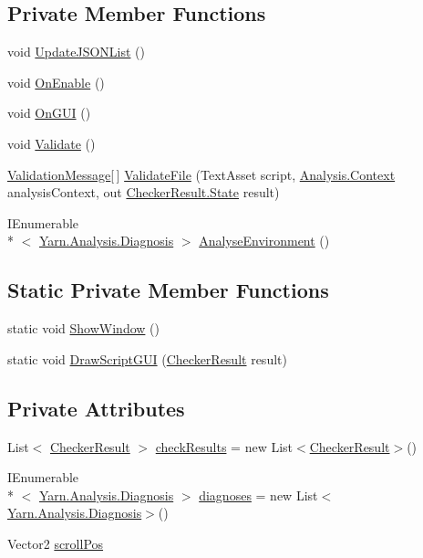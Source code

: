 \subsection*{Private Member Functions}
\begin{DoxyCompactItemize}
\item 
void \hyperlink{a00085_a8b798cbc0fad966781e9cc0de177fbd9}{Update\-J\-S\-O\-N\-List} ()
\item 
void \hyperlink{a00085_aeba1f39189758bd91bdce298e8859947}{On\-Enable} ()
\item 
void \hyperlink{a00085_aec84840262ae8fd7d84605778de1dc39}{On\-G\-U\-I} ()
\item 
void \hyperlink{a00085_ac4dbc30419c5647c1a2587b2ff7abd7c}{Validate} ()
\item 
\hyperlink{a00085_dc/de6/a00167}{Validation\-Message}\mbox{[}$\,$\mbox{]} \hyperlink{a00085_a6f2bf42b228ea29c6477e369226db8b6}{Validate\-File} (Text\-Asset script, \hyperlink{a00031}{Analysis.\-Context} analysis\-Context, out \hyperlink{a00024_ab24848d7951ce44eb3c7768c6ee10385}{Checker\-Result.\-State} result)
\item 
I\-Enumerable\\*
$<$ \hyperlink{a00035}{Yarn.\-Analysis.\-Diagnosis} $>$ \hyperlink{a00085_a9c207786c349120dc439bdce53072191}{Analyse\-Environment} ()
\end{DoxyCompactItemize}
\subsection*{Static Private Member Functions}
\begin{DoxyCompactItemize}
\item 
static void \hyperlink{a00085_a2084e2ce6ccf18094a992985aa5330fb}{Show\-Window} ()
\item 
static void \hyperlink{a00085_a1a7e1a855bb2a9549eb1c0eb292c9b85}{Draw\-Script\-G\-U\-I} (\hyperlink{a00024}{Checker\-Result} result)
\end{DoxyCompactItemize}
\subsection*{Private Attributes}
\begin{DoxyCompactItemize}
\item 
List$<$ \hyperlink{a00024}{Checker\-Result} $>$ \hyperlink{a00085_aa85ab7bd194e5425b991b9c216d4d10e}{check\-Results} = new List$<$\hyperlink{a00024}{Checker\-Result}$>$()
\item 
I\-Enumerable\\*
$<$ \hyperlink{a00035}{Yarn.\-Analysis.\-Diagnosis} $>$ \hyperlink{a00085_ab4784aaee761b7c60bb142cd410eb774}{diagnoses} = new List$<$\hyperlink{a00035}{Yarn.\-Analysis.\-Diagnosis}$>$()
\item 
Vector2 \hyperlink{a00085_a2d9b9702b0980af9d4202aebd440124b}{scroll\-Pos}
\end{DoxyCompactItemize}


